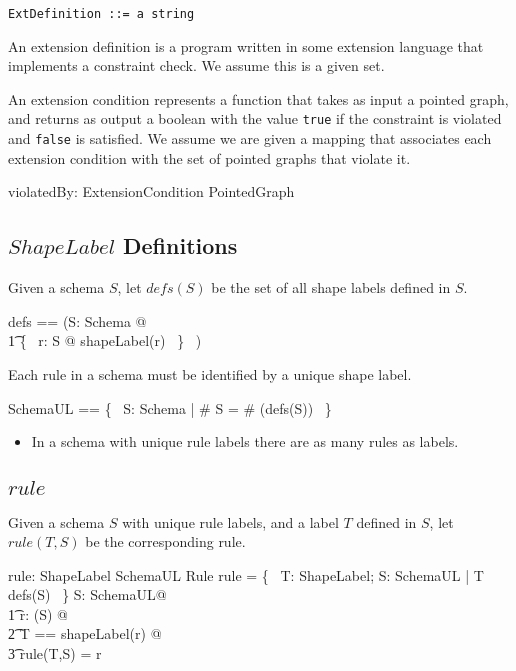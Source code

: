 \documentclass{article}
\begin{document}
\begin{verbatim}
ExtDefinition ::= a string
\end{verbatim}

An extension definition is a program written in some extension language that implements a constraint check.
We assume this is a given set.
\begin{zed}
	[ExtDefinition]
\end{zed}

An extension condition represents a function that takes as input a pointed graph, and returns
as output a boolean with the value {\tt true} if the constraint is violated and {\tt false} is satisfied.
We assume we are given a mapping that associates each extension condition with the set of pointed graphs that violate it.
\begin{axdef}
	violatedBy: ExtensionCondition \fun \power PointedGraph
\end{axdef}

\subsection{$ShapeLabel$ Definitions}
Given a schema $S$, let $defs(S)$ be the set of all shape labels defined in $S$.
\begin{zed}
	defs == (\lambda S: Schema @ \\
\t1		\{~ r: \ran S @ shapeLabel(r) ~\} ~)
\end{zed}
 
Each rule in a schema must be identified by a unique shape label.
\begin{zed}
	SchemaUL == \{~ S: Schema | \# S = \# (defs(S)) ~\}
\end{zed}
\begin{itemize}
\item In a schema with unique rule labels there are as many rules as labels.
\end{itemize}

\subsection{$rule$}
Given a schema $S$ with unique rule labels, and a label $T$ defined in $S$, let $rule(T,S)$ be the corresponding rule.
\begin{axdef}
	rule: ShapeLabel \cross SchemaUL \pfun Rule
\where
	\dom rule = \{~ T: ShapeLabel; S: SchemaUL | T \in defs(S) ~\}
\also
	\forall S: SchemaUL@\\
\t1		\forall r: \ran(S) @ \\
\t2			\LET T == shapeLabel(r) @ \\
\t3				rule(T,S) = r
\end{axdef}
\end{document}

